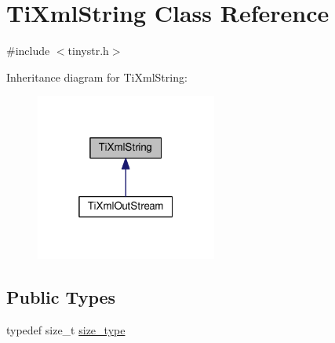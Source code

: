 \hypertarget{class_ti_xml_string}{}\section{Ti\+Xml\+String Class Reference}
\label{class_ti_xml_string}


{\ttfamily \#include $<$tinystr.\+h$>$}



Inheritance diagram for Ti\+Xml\+String\+:\nopagebreak
\begin{figure}[H]
\begin{center}
\leavevmode
\includegraphics[width=169pt]{class_ti_xml_string__inherit__graph}
\end{center}
\end{figure}
\subsection*{Public Types}
\begin{DoxyCompactItemize}
\item 
typedef size\+\_\+t \hyperlink{class_ti_xml_string_abeb2c1893a04c17904f7c06546d0b971}{size\+\_\+type}
\end{DoxyCompactItemize}
